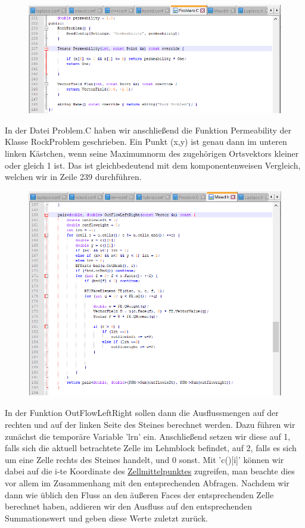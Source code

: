 \begin{figure}[H]
	\centering
	\includegraphics[width=\textwidth]{../../19/permprob.png}	
\end{figure}
In der Datei Problem.C haben wir anschließend die Funktion Permeability der Klasse RockProblem geschrieben.
Ein Punkt (x,y) ist genau dann im unteren linken Kästchen, wenn seine Maximumnorm des zugehörigen Ortsvektors kleiner oder gleich 1 ist. 
Das ist gleichbedeutend mit dem komponentenweisen Vergleich, welchen wir in Zeile 239 durchführen.


\begin{figure}[H]
	\centering
	\includegraphics[width=\textwidth]{../../19/mixedoutflow.png}
	
\end{figure}
In der Funktion OutFlowLeftRight sollen dann die Ausflussmengen auf der rechten und auf der linken Seite des Steines berechnet werden. 
Dazu führen wir zunächst die temporäre Variable 'lrn' ein. Anschließend setzen wir diese auf 1, falls sich die aktuell betrachtete Zelle im Lehmblock befindet, auf 2, falls es sich um eine Zelle rechts des Steines handelt, und 0 sonst. \newline
Mit 'c()[i]' können wir dabei auf die i-te Koordinate des \underline{Zellmittelpunktes} zugreifen, man beachte dies vor allem im Zusammenhang mit den entsprechenden Abfragen. 
Nachdem wir dann wie üblich den Fluss an den äußeren Faces der entsprechenden Zelle berechnet haben, addieren wir den Ausfluss auf den entsprechenden Summationswert und geben diese Werte zuletzt zurück.

